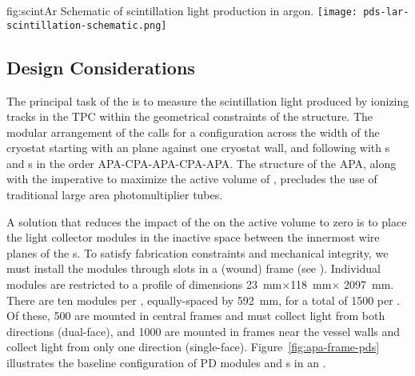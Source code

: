 \begin{dunefigure}{fig:scintAr}
{Schematic of scintillation light production in argon.}
\texttt{[image: pds-lar-scintillation-schematic.png]}
\end{dunefigure}

\subsection{Design Considerations}
\label{sec:fdsp-pd-des-consid}

The principal task of the   is to measure the  scintillation light produced by ionizing tracks in the TPC within the geometrical constraints of the  structure. The modular arrangement of the  calls for a configuration across the width of the cryostat starting with an  plane against one cryostat wall, and following with s and s in the order  APA-CPA-APA-CPA-APA.
The structure of the APA, along with the imperative to maximize the active volume of , precludes the use of traditional large area photomultiplier tubes.  

A solution that reduces the impact of the  on the active volume to zero is to place the light collector modules in the inactive space between the innermost wire planes of the s. To satisfy  fabrication constraints and mechanical integrity, we must install the modules through slots in a (wound)  frame 
(see \spchapa).  
Individual  modules are restricted to a profile of dimensions \SI{23}{mm}$\times$\SI{118}{mm}$\times$ \SI{2097}{mm}.  There are ten  modules per , equally-spaced by \SI{592}{mm}, for a total of \num{1500} per .  Of these, \num{500} are mounted in central  frames and must collect light from both directions (dual-face), and \num{1000} are mounted in frames  near the vessel walls and collect light from only one direction (single-face).
Figure~\ref{fig:apa-frame-pds} illustrates the baseline configuration of PD modules and s in an . 

